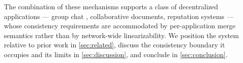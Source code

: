 The combination of these mechanisms supports a class of decentralized applications --- group chat \citep{river}, collaborative documents, reputation systems --- whose consistency requirements are accommodated by per-application merge semantics rather than by network-wide linearizability. We position the system relative to prior work in \cref{sec:related}, discuss the consistency boundary it occupies and its limits in \cref{sec:discussion}, and conclude in \cref{sec:conclusion}.
